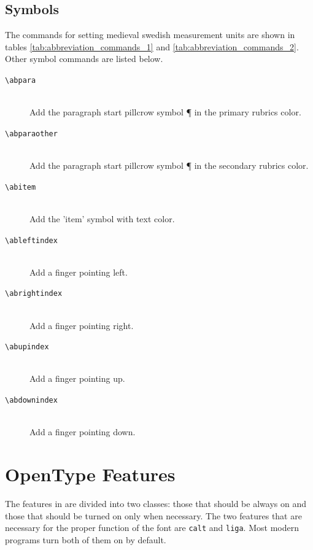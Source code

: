 \documentclass[a4paper]{article}
\newcommand{\feature}[1]{\texttt{#1}}
\newcommand{\ltxncmd}[1]{\texttt{\textbackslash{}#1}}
\begin{document}
\subsection{Symbols}

The commands for setting medieval swedish measurement units are shown
in tables \ref{tab:abbreviation_commands_1} and
\ref{tab:abbreviation_commands_2}. Other symbol commands are listed
below.

\begin{description}
\item[\ltxncmd{abpara}] \mbox{} \\
  Add the paragraph start pillcrow symbol ¶ in the primary rubrics
  color. 

\item[\ltxncmd{abparaother}] \mbox{} \\
  Add the paragraph start pillcrow symbol ¶ in the secondary rubrics
  color. 

\item[\ltxncmd{abitem}] \mbox{} \\
  Add the 'item' symbol with text color. 

\item [\ltxncmd{ableftindex}] \mbox{} \\
  Add a finger pointing left. 

\item [\ltxncmd{abrightindex}]\mbox{} \\
  Add a finger pointing right. 

\item [\ltxncmd{abupindex}]\mbox{} \\
  Add a finger pointing up.

\item [\ltxncmd{abdownindex}]\mbox{} \\
  Add a finger pointing down. 

\end{description}





\section{OpenType Features}\label{sec_opentype}

The features in \Aboensis{} are divided into two classes: those that
should be always on and those that should be turned on only when
necessary. The two features that are necessary for the proper function
of the font are \feature{calt} and \feature{liga}. Most modern
programs turn both of them on by default.
\end{document}
